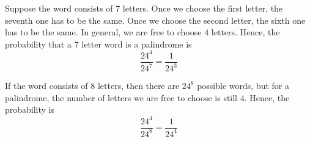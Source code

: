 Suppose the word consists of $7$ letters. Once we choose the first letter, the seventh one has to be the same. Once we choose the second letter, the sixth one has to be the same. In general, we are free to choose $4$ letters. Hence, the probability that a $7$ letter word is a palindrome is $$\frac{24^{4}}{24^{7}} = \frac{1}{24^{3}}$$

If the word consists of $8$ letters, then there are $24^{8}$ possible words, but for a palindrome, the number of letters we are free to choose is still $4$. Hence, the probability is $$\frac{24^{4}}{24^{8}} = \frac{1}{24^{4}}$$